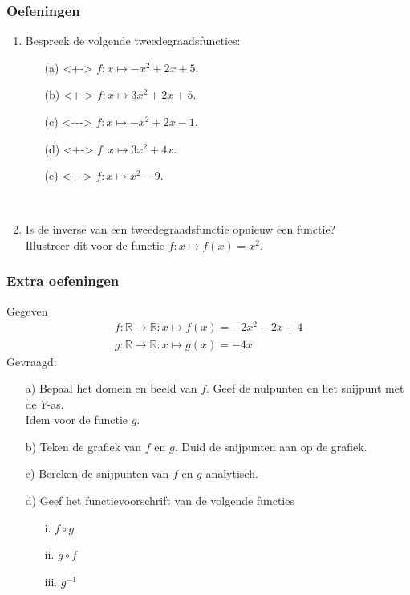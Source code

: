 \begin{frame}
\frametitle{Oefeningen}
\pause
\begin{enumerate}
\item<+-> Bespreek de volgende tweedegraadsfuncties:
      \begin{enumerate}
      \item[(a)]<+-> $f:x\mapsto -x^2+2x+5$.
      \item[(b)]<+-> $f:x\mapsto 3x^2+2x+5$.
      \item[(c)]<+-> $f:x\mapsto -x^2+2x-1$.
      \item[(d)]<+-> $f:x\mapsto 3x^2+4x$.
      \item[(e)]<+-> $f:x\mapsto x^2-9$.
      \end{enumerate}
      ~\\
\item<+-> Is de inverse van een tweedegraadsfunctie opnieuw een functie?\\
      Illustreer dit voor de functie $f:x\mapsto f(x)=x^2$.
\end{enumerate}
\end{frame}

\begin{frame}
\frametitle{Extra oefeningen}
\pause
Gegeven
\[\begin{array}{l}
  f:\mathbb{R} \rightarrow \mathbb{R} : x \mapsto f(x)=-2x^2-2x+4\\
	g:\mathbb{R} \rightarrow \mathbb{R} : x \mapsto g(x)=-4x
	\end{array}
\]
Gevraagd:
\begin{enumerate}
\item[a)] Bepaal het domein en beeld van $f$. Geef de nulpunten en het snijpunt met de $Y$-as.\\
      Idem voor de functie $g$.
\item[b)] Teken de grafiek van $f$ en $g$. Duid de snijpunten aan op de grafiek.
\item[c)] Bereken de snijpunten van $f$ en $g$ analytisch.
\item[d)] Geef het functievoorschrift van de volgende functies
      \begin{enumerate}
			\item[i.] $f \circ g$
			\item[ii.] $g \circ f$
			\item[iii.] $g^{-1}$
			\end{enumerate}
\end{enumerate}
\end{frame}
